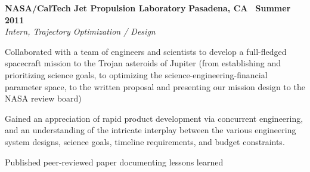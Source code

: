 \documentclass[10pt]{article}
\newcommand{\leftandright}[2]{\noindent\textbf{#1}\hfill
\textbf{#2}}
\begin{document}
\leftandright{NASA/CalTech Jet Propulsion Laboratory}{Pasadena, CA \textbullet\, Summer 2011}\\  
\vspace{-0.8em}
\textit{Intern, Trajectory Optimization / Design} 
\begin{itemize*}
  \item

    Collaborated with a team of engineers and scientists to develop a full-fledged spacecraft mission to
    the Trojan asteroids of Jupiter
    (from %
    establishing and prioritizing science goals, to optimizing the science-engineering-financial
    parameter space, to the written proposal and presenting our mission design to the NASA review
    board)
  \item 
    Gained an appreciation of rapid product development via concurrent
    engineering, and an understanding of the intricate interplay between the
    various engineering system designs, science goals, timeline
    requirements, and budget constraints.
  \item Published peer-reviewed paper documenting lessons learned
\end{itemize*}
\end{document}
